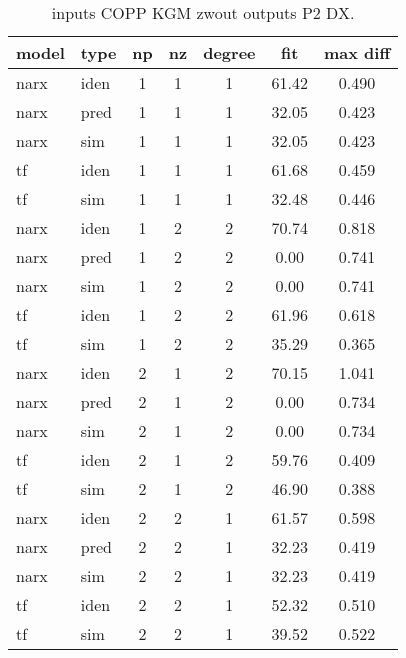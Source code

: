 \begin{table}[htbp] 
	\centering 
	\begin{tabular}{ll|ccc|cc} 
		\hline 
		model & type & np & nz & degree & fit & max diff \\ 
		\hline 
		narx  & iden & 1  & 1  & 1  & 61.42 & 0.490 \\ 
		narx  & pred & 1  & 1  & 1  & 32.05 & 0.423 \\ 
		narx  & sim & 1  & 1  & 1  & 32.05 & 0.423 \\ 
		tf  & iden & 1  & 1  & 1  & 61.68 & 0.459 \\ 
		tf  & sim & 1  & 1  & 1  & 32.48 & 0.446 \\ 
		\hline 
		narx  & iden & 1  & 2  & 2  & 70.74 & 0.818 \\ 
		narx  & pred & 1  & 2  & 2  & 0.00 & 0.741 \\ 
		narx  & sim & 1  & 2  & 2  & 0.00 & 0.741 \\ 
		tf  & iden & 1  & 2  & 2  & 61.96 & 0.618 \\ 
		tf  & sim & 1  & 2 & 2  & 35.29 & 0.365 \\ 
		\hline 
		narx  & iden & 2  & 1  & 2  & 70.15 & 1.041 \\ 
		narx  & pred & 2  & 1  & 2  & 0.00 & 0.734 \\ 
		narx  & sim & 2  & 1  & 2  & 0.00 & 0.734 \\ 
		tf  & iden & 2  & 1  & 2  & 59.76 & 0.409 \\ 
		tf  & sim & 2  & 1  & 2  & 46.90 & 0.388 \\ 
		\hline 
		narx  & iden & 2  & 2  & 1  & 61.57 & 0.598 \\ 
		narx  & pred & 2  & 2  & 1  & 32.23 & 0.419 \\ 
		narx  & sim & 2  & 2  & 1  & 32.23 & 0.419 \\ 
		tf  & iden & 2  & 2  & 1  & 52.32 & 0.510 \\ 
		tf  & sim & 2  & 2 & 1  & 39.52 & 0.522 \\ 
		\hline 
	\end{tabular} 
	\caption[inputs COPP KGM zwout   outputs P2 DX]{inputs COPP KGM zwout   outputs P2 DX.} 
	\label{tab:inputs COPP KGM zwout   outputs P2 DX} 
\end{table}